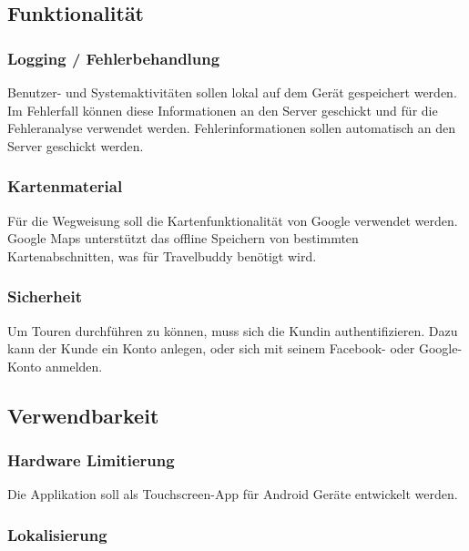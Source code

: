\documentclass[a4paper,10pt,xetex]{article}
\begin{document}
\subsection{Funktionalität}\label{funktionalituxe4t}

\subsubsection{Logging /
Fehlerbehandlung}\label{logging-fehlerbehandlung}

Benutzer- und Systemaktivitäten sollen lokal auf dem Gerät gespeichert
werden. Im Fehlerfall können diese Informationen an den Server geschickt
und für die Fehleranalyse verwendet werden. Fehlerinformationen sollen
automatisch an den Server geschickt werden.

\subsubsection{Kartenmaterial}\label{kartenmaterial}

Für die Wegweisung soll die Kartenfunktionalität von Google verwendet
werden. Google Maps unterstützt das offline Speichern von bestimmten
Kartenabschnitten, was für Travelbuddy benötigt wird.

\subsubsection{Sicherheit}\label{sicherheit}

Um Touren durchführen zu können, muss sich die Kundin authentifizieren.
Dazu kann der Kunde ein Konto anlegen, oder sich mit seinem Facebook-
oder Google-Konto anmelden.

\subsection{Verwendbarkeit}\label{verwendbarkeit}

\subsubsection{Hardware Limitierung}\label{hardware-limitierung}

Die Applikation soll als Touchscreen-App für Android Geräte entwickelt
werden.

\subsubsection{Lokalisierung}\label{lokalisierung}
\end{document}

